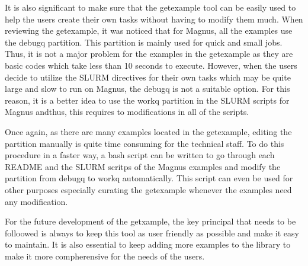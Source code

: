 It is also significant to make sure that the getexample tool can be easily used to help the users create their own tasks without having to modify them
much. When reviewing the getexample, it was noticed that for Magnus, all the examples use the debugq partition. This partition is mainly used
for quick and small jobs. Thus, it is not a major problem for the examples in the getexample as they are basic codes which take less than 10 seconds 
to execute. However, when the users decide to utilize the SLURM directives for their own tasks which may be quite large and slow to run on Magnus, the 
debugq is not a suitable option. For this reason, it is a better idea to use the workq partition in the SLURM scripts for Magnus andthus, this requires 
to modifications in all of the scripts.

Once again, as there are many examples located in the getexample, editing the partition manually is quite time consuming for the technical staff. To do 
this procedure in a faster way, a bash script can be written to go through each README and the SLURM scritps of the Magnus examples and modify the 
partition from debugq to workq automatically. This script can even be used for other purposes especially curating the getexample whenever the examples 
need any modification.   

For the future development of the getxample, the key principal that needs to be folloowed is always to keep this tool as user friendly as possible and 
make it easy to maintain. It is also essential to keep adding more examples to the library to make it more compherensive for the needs of the users.  
